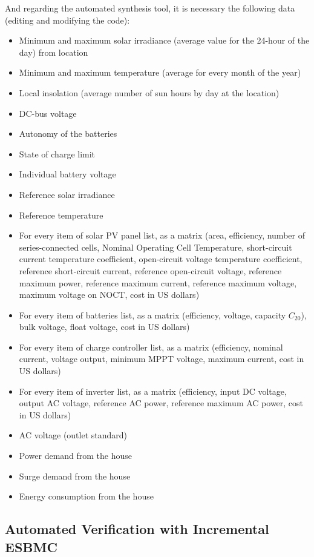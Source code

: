 And regarding the automated synthesis tool, it is necessary the following data (editing and modifying the code):

\begin{itemize}
\item Minimum and maximum solar irradiance (average value for the 24-hour of the day) from location
\item Minimum and maximum temperature (average for every month of the year)
\item Local insolation (average number of sun hours by day at the location)
\item DC-bus voltage
\item Autonomy of the batteries
\item State of charge limit
\item Individual battery voltage
\item Reference solar irradiance
\item Reference temperature
\item For every item of solar PV panel list, as a matrix (area, efficiency, number of series-connected cells, Nominal Operating Cell Temperature, short-circuit current temperature coefficient, open-circuit voltage temperature coefficient, reference short-circuit current, reference open-circuit voltage, reference maximum power, reference maximum current, reference maximum voltage, maximum voltage on NOCT, cost in US dollars)
\item For every item of batteries list, as a matrix (efficiency, voltage, capacity $C_{20}$), bulk voltage, float voltage, cost in US dollars)
\item For every item of charge controller list, as a matrix (efficiency, nominal current, voltage  output, minimum MPPT voltage, maximum current, cost in US dollars)
\item For every item of inverter list, as a matrix (efficiency, input DC voltage, output AC voltage, reference AC power, reference maximum AC power, cost in US dollars)
\item AC voltage (outlet standard)
\item Power demand from the house
\item Surge demand from the house
\item Energy consumption from the house
\end{itemize}


\subsection{Automated Verification with Incremental ESBMC}

